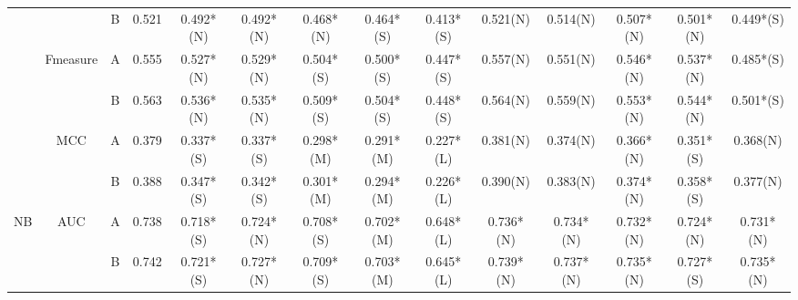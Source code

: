 \begin{table*}
{\begin{tabular}{|c|c|c|c|c|c|c|c|c|c|c|c|c|c|}
                      &                            & B                                                                             & 0.521         & 0.492*(N)            & 0.492*(N)        & 0.468*(N)       & 0.464*(S)       & 0.413*(S)         & 0.521(N)        & 0.514(N)       & 0.507*(N)      & 0.501*(N)        & 0.449*(S)     \\ \cline{2-14} 
                      & \multirow{2}{*}{Fmeasure}  & A                                                                             & 0.555         & 0.527*(N)            & 0.529*(N)        & 0.504*(S)       & 0.500*(S)         & 0.447*(S)         & 0.557(N)        & 0.551(N)       & 0.546*(N)      & 0.537*(N)        & 0.485*(S)     \\ \cline{3-14} 
                      &                            & B                                                                             & 0.563         & 0.536*(N)            & 0.535*(N)        & 0.509*(S)       & 0.504*(S)       & 0.448*(S)         & 0.564(N)        & 0.559(N)       & 0.553*(N)      & 0.544*(N)        & 0.501*(S)     \\ \cline{2-14} 
                      & \multirow{2}{*}{MCC}       & A                                                                             & 0.379         & 0.337*(S)            & 0.337*(S)        & 0.298*(M)       & 0.291*(M)       & 0.227*(L)         & 0.381(N)        & 0.374(N)       & 0.366*(N)      & 0.351*(S)        & 0.368(N)      \\ \cline{3-14} 
                      &                            & B                                                                             & 0.388         & 0.347*(S)            & 0.342*(S)        & 0.301*(M)       & 0.294*(M)       & 0.226*(L)         & 0.390(N)         & 0.383(N)       & 0.374*(N)      & 0.358*(S)        & 0.377(N)      \\ \hline
\multirow{10}{*}{NB}  & \multirow{2}{*}{AUC}       & A                                                                             & 0.738         & 0.718*(S)            & 0.724*(N)        & 0.708*(S)       & 0.702*(M)       & 0.648*(L)         & 0.736*(N)       & 0.734*(N)      & 0.732*(N)      & 0.724*(N)        & 0.731*(N)     \\ \cline{3-14} 
                      &                            & B                                                                             & 0.742         & 0.721*(S)            & 0.727*(N)        & 0.709*(S)       & 0.703*(M)       & 0.645*(L)         & 0.739*(N)       & 0.737*(N)      & 0.735*(N)      & 0.727*(S)        & 0.735*(N)     \\ \cline{2-14} 

\end{tabular}}
\end{table*}
